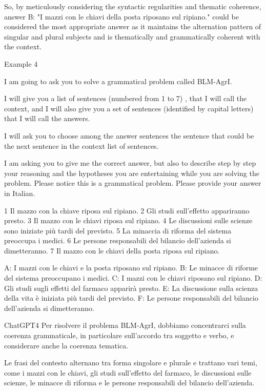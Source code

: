 So, by meticulously considering the syntactic regularities and thematic coherence, answer B: "I mazzi con le chiavi della posta riposano sul ripiano." could be considered the most appropriate answer as it maintains the alternation pattern of singular and plural subjects and is thematically and grammatically coherent with the context.


Example 4

I am going to ask you to solve a grammatical problem called BLM-AgrI.  

I will give you a list of sentences (numbered from 1 to 7) , that I will call the context, and I will also give you a set of sentences (identified by capital letters) that I will call  the answers. 

I will ask you to choose among the answer sentences the sentence that could be the next sentence in the context list of sentences.

I am asking you to give me the correct answer, but also to describe step by step  your reasoning and the hypotheses you are entertaining while you are solving the problem. Please notice this is a grammatical problem.
Please provide your answer in Italian.

1 Il mazzo con la chiave riposa sul ripiano.
2 Gli studi sull'effetto appariranno presto.
3 Il mazzo con le chiavi riposa sul ripiano.
4 Le discussioni sulle scienze sono iniziate più tardi del previsto.
5 La minaccia di riforma del sistema preoccupa i medici.
6 Le persone responsabili del bilancio dell'azienda si dimetteranno.
7 Il mazzo con le chiavi della posta riposa sul ripiano.


A: I mazzi con le chiavi e la posta riposano sul  ripiano.
B: Le minacce di riforme del sistema preoccupano i medici.
C: I mazzi con le chiavi riposano sul ripiano.
D: Gli studi sugli effetti del farmaco apparirà presto.
E: La discussione sulla scienza della vita è iniziata più tardi del previsto.
F: Le persone responsabili del bilancio dell'azienda si dimetteranno.

ChatGPT4
Per risolvere il problema BLM-AgrI, dobbiamo concentrarci sulla coerenza grammaticale, in particolare sull'accordo tra soggetto e verbo, e considerare anche la coerenza tematica.

Le frasi del contesto alternano tra forma singolare e plurale e trattano vari temi, come i mazzi con le chiavi, gli studi sull'effetto del farmaco, le discussioni sulle scienze, le minacce di riforma e le persone responsabili del bilancio dell'azienda.


